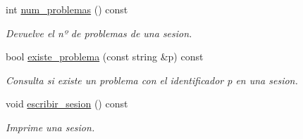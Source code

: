 \begin{DoxyCompactItemize}
int \mbox{\hyperlink{class_sesion_a32dcea163badd79a3ffe111957741de9}{num\+\_\+problemas}} () const
\begin{DoxyCompactList}\small\item\em Devuelve el nº de problemas de una sesion. \end{DoxyCompactList}\item 
bool \mbox{\hyperlink{class_sesion_a5b175e13592d600ccc17a80789735382}{existe\+\_\+problema}} (const string \&p) const
\begin{DoxyCompactList}\small\item\em Consulta si existe un problema con el identificador p en una sesion. \end{DoxyCompactList}\item 
void \mbox{\hyperlink{class_sesion_a0472395ecd329355cccd46b3d3e8a8a0}{escribir\+\_\+sesion}} () const
\begin{DoxyCompactList}\small\item\em Imprime una sesion. \end{DoxyCompactList}\end{DoxyCompactItemize}
